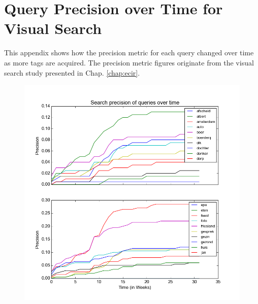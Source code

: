 \chapter{Query Precision over Time for Visual Search}\label{appen:precovertime}
This appendix shows how the precision metric for each query changed over time as more tags are acquired. The precision metric figures originate from the visual search study presented in Chap. \ref{chap:ecir}.

\begin{figure}[H]
\centering
\includegraphics[scale=0.55]{appendixb/precisionovertime0}
\end{figure}


